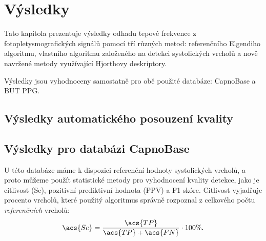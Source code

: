 
\chapter{Výsledky} %
\label{ch:vysledky}
Tato kapitola prezentuje výsledky odhadu tepové frekvence z fotopletysmografických signálů pomocí tří různých metod:
referenčního Elgendiho algoritmu, vlastního algoritmu založeného na detekci systolických vrcholů a nově navržené metody využívající Hjorthovy deskriptory.

Výsledky jsou vyhodnoceny samostatně pro obě použité databáze: CapnoBase a \acl{BUT PPG}.

\section{Výsledky automatického posouzení kvality}
\label{sec:vysledky_kvalita}

\section{Výsledky pro databázi CapnoBase}
\label{sec:vysledky_capnobase}
U této databáze máme k dispozici referenční hodnoty systolických vrcholů, a proto můžeme použít statistické metody pro vyhodnocení kvality detekce, jako je citlivost (\acs{Se}), pozitivní prediktivní hodnota (\acs{PPV}) a F1 skóre.
Citlivost vyjadřuje procento vrcholů, které použitý algoritmus správně rozpoznal z celkového počtu \textit{referenčních} vrcholů:
\begin{equation}
	\label{eq:se}
	\acs{Se} = \frac{\acs{TP}}{\acs{TP} + \acs{FN}} \cdot 100\%.
\end{equation}

